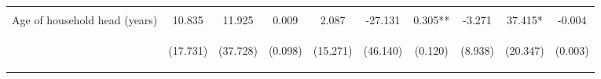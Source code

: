 \begin{center}
\begin{tabular}{lccccccccc}
\vspace{4pt} & \begin{footnotesize}[0.010]\end{footnotesize} & \begin{footnotesize}[0.688]\end{footnotesize} & \begin{footnotesize}[0.350]\end{footnotesize} & \begin{footnotesize}[0.590]\end{footnotesize} & \begin{footnotesize}[0.989]\end{footnotesize} & \begin{footnotesize}[0.829]\end{footnotesize} & \begin{footnotesize}[0.000]\end{footnotesize} & \begin{footnotesize}[0.000]\end{footnotesize} & \begin{footnotesize}[0.000]\end{footnotesize} \\
Age of household head (years) & 10.835 & 11.925 & 0.009 & 2.087 & -27.131 & 0.305** & -3.271 & 37.415* & -0.004 \\
 & \begin{footnotesize}(17.731)\end{footnotesize} & \begin{footnotesize}(37.728)\end{footnotesize} & \begin{footnotesize}(0.098)\end{footnotesize} & \begin{footnotesize}(15.271)\end{footnotesize} & \begin{footnotesize}(46.140)\end{footnotesize} & \begin{footnotesize}(0.120)\end{footnotesize} & \begin{footnotesize}(8.938)\end{footnotesize} & \begin{footnotesize}(20.347)\end{footnotesize} & \begin{footnotesize}(0.003)\end{footnotesize} \\

\end{tabular}
\end{center}
